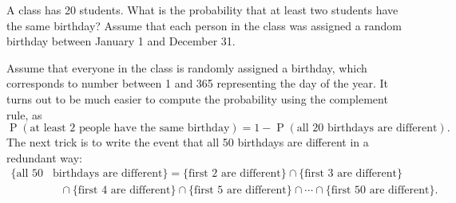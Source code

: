\documentclass[answers,11pt]{exam}
\DeclareMathOperator*{\Prob}{P}
\renewcommand{\Pr}{\Prob}
\begin{document}
\begin{questions}

\newpage

\question A class has 20 students.  What is the probability that at least
two students have the same birthday?  Assume that each person in the class was
assigned a random birthday between January 1 and December 31.

\begin{solution}
Assume that everyone in the class is randomly assigned a birthday, which
corresponds to number between 1 and 365 representing the day of the year.
It turns out to be much easier to compute the probability using the complement
rule, as
\[
  \Pr(\text{at least 2 people have the same birthday})
  = 1 - \Pr(\text{all 20 birthdays are different}).
\]
The next trick is to write the event that all 50 birthdays are different in a
redundant way:
\begin{align*}
\{\text{all 50} &\text{ birthdays are different}\}
  = \{ \text{first 2 are different} \}
  \cap \{ \text{first 3 are different} \} \\
  &\quad\cap \{ \text{first 4 are different} \}
  \cap \{ \text{first 5 are different} \}
  \cap \dotsb \cap \{ \text{first 50 are different} \}.
\end{align*}


\end{solution}
\end{questions}
\end{document}
